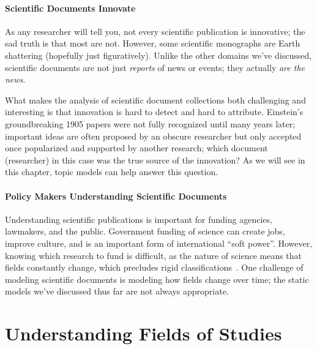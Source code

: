 \paragraph{Scientific Documents Innovate}

As any researcher will tell you, not every scientific publication is innovative;
the sad truth is that most are not.  However, some scientific monographs are
Earth shattering (hopefully just figuratively).  Unlike the other domains we've
discussed, scientific documents are not just \emph{reports} of news or events;
they actually \emph{are the news}.

What makes the analysis of scientific document collections both challenging and
interesting is that innovation is hard to detect and hard to attribute.
Einstein's groundbreaking 1905 papers were not fully recognized until many years
later; important ideas are often proposed by an obscure researcher but only accepted
once popularized and supported by another research; which document (researcher)
in this case was the true source of the innovation?  As we will see in this
chapter, topic models can help answer this question.

\paragraph{Policy Makers Understanding Scientific Documents}

Understanding scientific publications is important for funding agencies,
lawmakers, and the public.  Government funding of science can create jobs,
improve culture, and is an important form of international ``soft power''.
However, knowing which research to fund is difficult, as the nature of science
means that fields constantly change, which precludes rigid
classifications~\citep{szostak-04}.  One challenge of modeling scientific
documents is modeling how fields change over time; the static models we've
discussed thus far are not always appropriate.

\section{Understanding Fields of Studies}
\label{sec:sci_fields}

